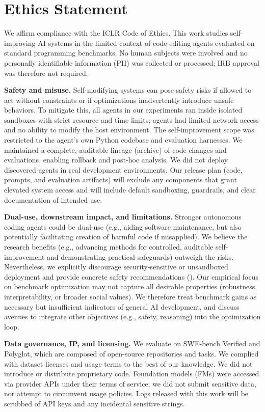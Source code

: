 \section*{Ethics Statement}

We affirm compliance with the ICLR Code of Ethics. This work studies self-improving AI systems in the limited context of code-editing agents evaluated on standard programming benchmarks. No human subjects were involved and no personally identifiable information (PII) was collected or processed; IRB approval was therefore not required.

\textbf{Safety and misuse.}
Self-modifying systems can pose safety risks if allowed to act without constraints or if optimizations inadvertently introduce unsafe behaviors. To mitigate this, all agents in our experiments ran inside isolated sandboxes with strict resource and time limits; agents had limited network access and no ability to modify the host environment. The self-improvement scope was restricted to the agent’s own Python codebase and evaluation harnesses. We maintained a complete, auditable lineage (archive) of code changes and evaluations, enabling rollback and post-hoc analysis. We did not deploy discovered agents in real development environments. Our release plan (code, prompts, and evaluation artifacts) will exclude any components that grant elevated system access and will include default sandboxing, guardrails, and clear documentation of intended use.

\textbf{Dual-use, downstream impact, and limitations.}
Stronger autonomous coding agents could be dual-use (e.g., aiding software maintenance, but also potentially facilitating creation of harmful code if misapplied). We believe the research benefits (e.g., advancing methods for controlled, auditable self-improvement and demonstrating practical safeguards) outweigh the risks. Nevertheless, we explicitly discourage security-sensitive or unsandboxed deployment and provide concrete safety recommendations (). Our empirical focus on benchmark optimization may not capture all desirable properties (robustness, interpretability, or broader social values). We therefore treat benchmark gains as necessary but insufficient indicators of general AI development, and discuss avenues to integrate other objectives (e.g., safety, reasoning) into the optimization loop.

\textbf{Data governance, IP, and licensing.}
We evaluate on SWE-bench Verified and Polyglot, which are composed of open-source repositories and tasks. We complied with dataset licenses and usage terms to the best of our knowledge. We did not introduce or distribute proprietary code. Foundation models (FMs) were accessed via provider APIs under their terms of service; we did not submit sensitive data, nor attempt to circumvent usage policies. Logs released with this work will be scrubbed of API keys and any incidental sensitive strings.

